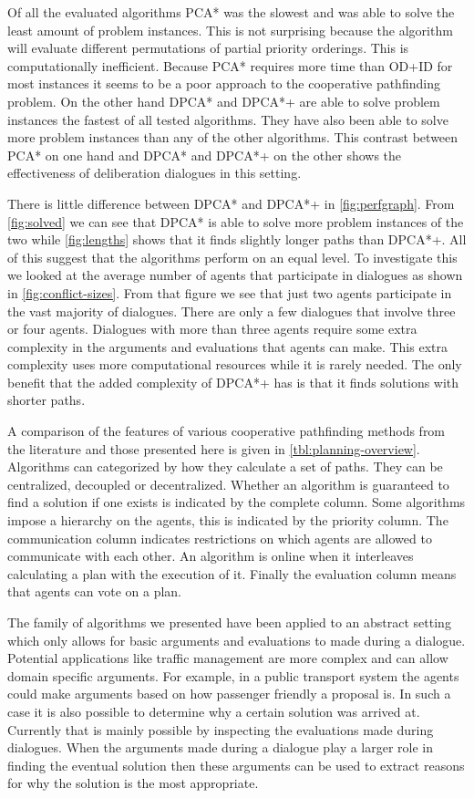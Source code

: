Of all the evaluated algorithms PCA* was the slowest and was able to solve the 
least amount of problem instances. This is not surprising because the algorithm 
will evaluate different permutations of partial priority orderings. This is 
computationally inefficient. Because PCA* requires more time than OD+ID for 
most instances it seems to be a poor approach to the cooperative pathfinding 
problem. On the other hand  DPCA* and DPCA*+ are able to solve problem 
instances the fastest of all tested algorithms. They have also been able to 
solve more problem instances than any of the other algorithms. This contrast 
between PCA* on one hand and DPCA* and DPCA*+ on the other shows the 
effectiveness of deliberation dialogues in this setting.

There is little difference between DPCA* and DPCA*+ in \autoref{fig:perfgraph}. 
From \autoref{fig:solved} we can see that DPCA* is able to solve more problem 
instances of the two while \autoref{fig:lengths} shows that it finds slightly 
longer paths than DPCA*+. All of this suggest that the algorithms perform on an 
equal level. To investigate this we looked at the average number of agents that 
participate in dialogues as shown in \autoref{fig:conflict-sizes}. From that 
figure we see that just two agents participate in the vast majority of 
dialogues. There are only a few dialogues that involve three or four agents.
Dialogues with more than three agents require some extra complexity in the 
arguments and evaluations that agents can make. This extra complexity uses more 
computational resources while it is rarely needed. The only benefit that the 
added complexity of DPCA*+ has is that it finds solutions with shorter paths.

A comparison of the features of various cooperative pathfinding methods from 
the literature and those presented here is given in 
\autoref{tbl:planning-overview}. Algorithms can categorized by how  they 
calculate a set of paths. They can be centralized, decoupled or decentralized. 
Whether an algorithm is guaranteed to find a solution if one exists is 
indicated by the complete column. Some algorithms impose a hierarchy on the 
agents, this is indicated by the priority column. The communication column 
indicates restrictions on which agents are allowed to communicate with each 
other. An algorithm is online when it interleaves calculating a plan with the 
execution of it. Finally the evaluation column means that agents can vote on a 
plan.

The family of algorithms we presented have been applied to an abstract setting 
which only allows for basic arguments and evaluations to made during a 
dialogue. Potential applications like traffic management are more complex and 
can allow domain specific arguments. For example, in a public transport system 
the agents could make arguments based on how passenger friendly a proposal is.
In such a case it is also possible to determine why a certain solution was 
arrived at. Currently that is mainly possible by inspecting the evaluations 
made during dialogues. When the arguments made during a dialogue play a larger 
role in finding the eventual solution then these arguments can be used to 
extract reasons for why the solution is the most appropriate.
